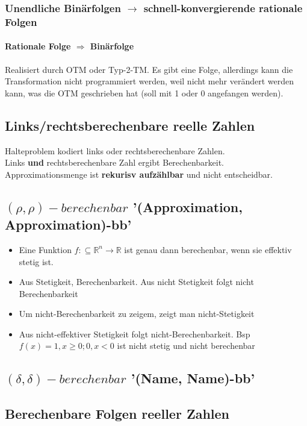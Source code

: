 \documentclass[ngerman]{scrartcl}
\begin{document}
\subsubsection{Unendliche Binärfolgen $ \rightarrow $ schnell-konvergierende rationale Folgen}
\paragraph{Rationale Folge $ \Rightarrow $ Binärfolge}
Realisiert durch OTM oder Typ-2-TM. Es gibt eine Folge, allerdings kann die Transformation nicht programmiert werden, weil nicht mehr verändert werden kann, was die OTM geschrieben hat (soll mit 1 oder 0 angefangen werden).


\subsection{Links/rechtsberechenbare reelle Zahlen}
Halteproblem kodiert links oder rechtsberechenbare Zahlen. \\
Links \textbf{und} rechtsberechenbare Zahl ergibt Berechenbarkeit. Approximationsmenge ist \textbf{rekurisv aufzählbar} und nicht entscheidbar.


\subsection{$ (\rho, \rho)-berechenbar $ '(Approximation, Approximation)-bb'}
\begin{itemize}
  \item Eine Funktion $ f: \subseteq \mathbb{R}^n \rightarrow \mathbb{R} $ ist genau dann berechenbar, wenn sie effektiv stetig ist.
  \item Aus Stetigkeit, Berechenbarkeit. Aus nicht Stetigkeit folgt nicht Berechenbarkeit
  \item Um nicht-Berechenbarkeit zu zeigem, zeigt man nicht-Stetigkeit 
  \item Aus nicht-effektiver Stetigkeit folgt nicht-Berechenbarkeit. Bsp $  f(x) = 1, x \geq 0; 0, x < 0 $ ist nicht stetig und nicht berechenbar
\end{itemize}

\subsection{$ (\delta, \delta)-berechenbar $ '(Name, Name)-bb'}

\subsection{Berechenbare Folgen reeller Zahlen}
\end{document}
